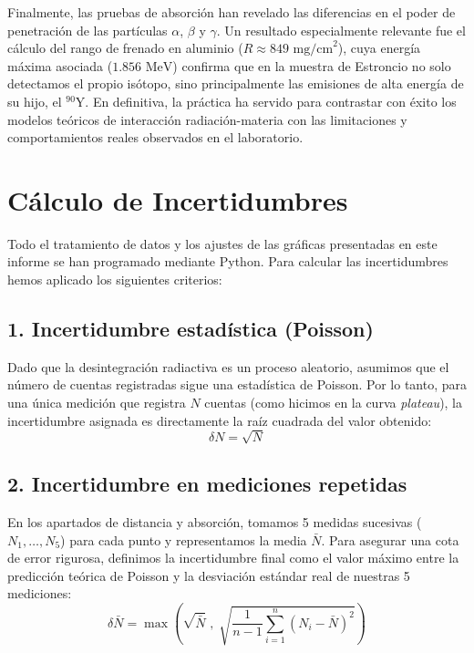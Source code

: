 \documentclass[9pt,a4paper,twocolumn,twoside]{rho-class/rho}
\begin{document}
Finalmente, las pruebas de absorción han revelado las diferencias en el poder de penetración de las partículas $\alpha$, $\beta$ y $\gamma$. Un resultado especialmente relevante fue el cálculo del rango de frenado en aluminio ($R \approx 849 \text{ mg/cm}^2$), cuya energía máxima asociada ($1.856 \text{ MeV}$) confirma que en la muestra de Estroncio no solo detectamos el propio isótopo, sino principalmente las emisiones de alta energía de su hijo, el $^{90}\text{Y}$. En definitiva, la práctica ha servido para contrastar con éxito los modelos teóricos de interacción radiación-materia con las limitaciones y comportamientos reales observados en el laboratorio.

\appendix

\section{Cálculo de Incertidumbres}

Todo el tratamiento de datos y los ajustes de las gráficas presentadas en este informe se han programado mediante Python. Para calcular las incertidumbres hemos aplicado los siguientes criterios:

\subsection*{1. Incertidumbre estadística (Poisson)}
Dado que la desintegración radiactiva es un proceso aleatorio, asumimos que el número de cuentas registradas sigue una estadística de Poisson. Por lo tanto, para una única medición que registra $N$ cuentas (como hicimos en la curva \textit{plateau}), la incertidumbre asignada es directamente la raíz cuadrada del valor obtenido:
\vspace{0.2cm}
\begin{equation*}
    \delta N = \sqrt{N}
\end{equation*}

\subsection*{2. Incertidumbre en mediciones repetidas}
En los apartados de distancia y absorción, tomamos 5 medidas sucesivas ($N_1, \dots, N_5$) para cada punto y representamos la media $\bar{N}$.
Para asegurar una cota de error rigurosa, definimos la incertidumbre final como el valor máximo entre la predicción teórica de Poisson y la desviación estándar real de nuestras 5 mediciones:
\vspace{0.2cm}
\begin{equation*}
    \delta \bar{N} = \max \left( \sqrt{\bar{N}} \; , \; \sqrt{\frac{1}{n-1}\sum_{i=1}^{n} (N_i - \bar{N})^2} \right)
\end{equation*}
\vspace{0.2cm}
\end{document}
